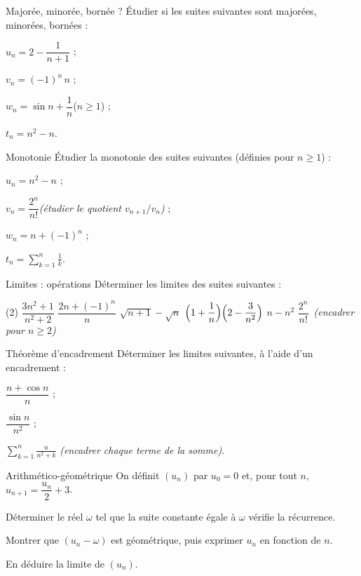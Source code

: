\begin{exercice}[1]{Majorée, minorée, bornée ?}
Étudier si les suites suivantes sont majorées, minorées, bornées :
\begin{questions}
  \item $u_n=2-\dfrac{1}{n+1}$ ;
  \item $v_n=(-1)^{n}\,n$ ;
  \item $w_n=\sin n+\dfrac1n$\quad($n\geq1$) ;
  \item $t_n=n^{2}-n$.
\end{questions}
\end{exercice}

\begin{exercice}[1]{Monotonie}
Étudier la monotonie des suites suivantes (définies pour $n\geq1$) :
\begin{questions}
  \item $u_n=n^{2}-n$ ;
  \item $v_n=\dfrac{2^{n}}{n!}$\quad\emph{(étudier le quotient $v_{n+1}/v_n$)} ;
  \item $w_n=n+(-1)^{n}$ ;
  \item $t_n=\displaystyle\sum_{k=1}^{n}\frac1k$.
\end{questions}
\end{exercice}

\begin{exercice}[1]{Limites : opérations}
Déterminer les limites des suites suivantes :
\begin{tasks}(2)
  \task $\dfrac{3n^{2}+1}{n^{2}+2}$
  \task $\dfrac{2n+(-1)^{n}}{n}$
  \task $\sqrt{n+1}-\sqrt{n}$
  \task $\Bigl(1+\dfrac1n\Bigr)\Bigl(2-\dfrac{3}{n^{2}}\Bigr)$
  \task $n-n^{2}$
  \task $\dfrac{2^{n}}{n!}$\ \emph{(encadrer pour $n\geq2$)}
\end{tasks}
\end{exercice}

\begin{exercice}[1]{Théorème d'encadrement}
Déterminer les limites suivantes, à l'aide d'un encadrement :
\begin{questions}
  \item $\dfrac{n+\cos n}{n}$ ;
  \item $\dfrac{\sin n}{n^{2}}$ ;
  \item $\displaystyle\sum_{k=1}^{n}\frac{n}{n^{2}+k}$\quad
    \emph{(encadrer chaque terme de la somme)}.
\end{questions}
\end{exercice}

\begin{exercice}[1]{Arithmético-géométrique}
On définit $(u_n)$ par $u_0=0$ et, pour tout $n$,
$u_{n+1}=\dfrac{u_n}{2}+3$.
\begin{questions}
  \item Déterminer le réel $\omega$ tel que la suite constante égale à
    $\omega$ vérifie la récurrence.
  \item Montrer que $(u_n-\omega)$ est géométrique, puis exprimer $u_n$ en
    fonction de $n$.
  \item En déduire la limite de $(u_n)$.
\end{questions}
\end{exercice}

